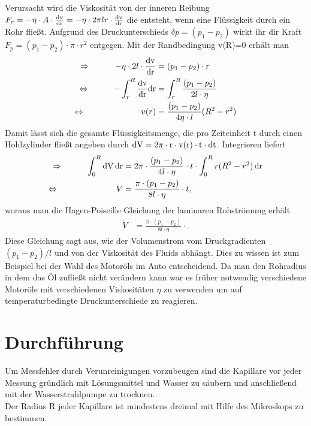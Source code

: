 \documentclass[12pt, a4paper, twoside]{scrartcl}
\begin{document}
Verursacht wird die Viskosität von der inneren Reibung $F_r=-\eta\cdot A\cdot\frac{\rm dv}{\rm dr}=-\eta\cdot 2\pi l r\cdot\frac{\rm dv}{\rm dr}$ die entsteht, wenn eine Flüssigkeit durch ein Rohr fließt. Aufgrund des Druckunterschieds $\delta p=(p_1-p_2)$ wirkt ihr dir Kraft $F_p=(p_1-p_2)\cdot\pi\cdot r^2$ entgegen. Mit der Randbedingung v(R)=0 erhält man
\begin{align*}
\Rightarrow\hspace{1cm}-\eta\cdot2 l\cdot\frac{\rm dv}{\rm dr}&=(p_1-p_2)\cdot r \\
\Leftrightarrow\hspace{1.0cm}-\int_r^R\frac{\rm dv}{\rm dr}\rm dr&=\int_r^R\frac{(p_1-p_2)}{2l\cdot\eta} \\
\Leftrightarrow\hspace{2.35cm}v(r)&=\frac{(p_1-p_2)}{4\eta\cdot l}(R^2-r^2)
\end{align*}
Damit lässt sich die gesamte Flüssigkeitsmenge, die pro Zeiteinheit t durch einen Hohlzylinder fließt angeben durch $\rm dV=2\pi\cdot r\cdot v(r)\cdot t\cdot dt$. Integrieren liefert
\begin{align*}
\Rightarrow \hspace*{1cm}\int_0^R\rm dV\,\rm dr&=2\pi\cdot\frac{(p_1-p_2)}{4l\cdot\eta}\cdot t\cdot\int_0^Rr(R^2-r^2)\,\rm dr \\
\Leftrightarrow \hspace*{2.4cm}V&=\frac{\pi\cdot(p_1-p_2)}{8l\cdot\eta}\cdot t\rm,
\end{align*}
woraus man die Hagen-Poiseille Gleichung der laminaren Rohströmung erhält
\begin{align*}
\dot V&=\frac{\pi\cdot(p_1-p_2)}{8l\cdot\eta}\cdot.
\end{align*}
Diese Gleichung sagt aus, wie der Volumenstrom vom Druckgradienten $(p_1-p_2)/l$ und von der Viskosität des Fluids abhängt. Dies zu wissen ist zum Beispiel bei der Wahl des Motoröls im Auto entscheidend. Da man den Rohradius in dem das Öl zufließt nicht verändern kann war es früher notwendig verschiedene Motoröle mit verschiedenen Viskositäten $\eta$ zu verwenden um auf temperaturbedingte Druckunterschiede zu reagieren.

\section{Durchführung}
\label{sec:durchfuehrung}

Um Messfehler durch Verunreinigungen vorzubeugen sind die Kapillare vor jeder Messung gründlich mit 
Lösungsmittel und Wasser zu säubern und anschließend mit der Wasserstrahlpumpe zu trocknen. \\
Der Radius R jeder Kapillare ist mindestens dreimal mit Hilfe des Mikroskops zu bestimmen.\\
\end{document}
